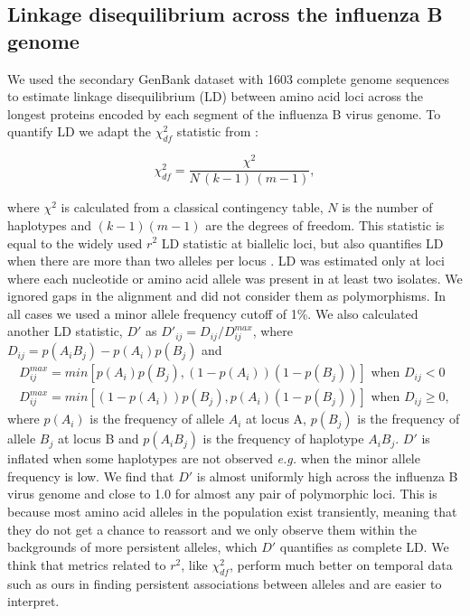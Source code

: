 \documentclass[11pt,oneside,letterpaper]{article}
\newcommand{\chiSq}{\chi^{2}_{df}}
\begin{document}
\subsection*{Linkage disequilibrium across the influenza B genome}
We used the secondary GenBank dataset with 1603 complete genome sequences to estimate linkage disequilibrium (LD) between amino acid loci across the longest proteins encoded by each segment of the influenza B virus genome.
To quantify LD we adapt the $\chiSq$ statistic from \citep{hedrick1986}:

\begin{equation}
\chiSq=\frac{\chi^{2}}{N\,(k-1)\,(m-1)},
\end{equation}

where $\chi^{2}$ is calculated from a classical contingency table, $N$ is the number of haplotypes and $(k-1)(m-1)$ are the degrees of freedom.
This statistic is equal to the widely used $r^2$ LD statistic at biallelic loci, but also quantifies LD when there are more than two alleles per locus \citep{zhao2005}.
LD was estimated only at loci where each nucleotide or amino acid allele was present in at least two isolates.
We ignored gaps in the alignment and did not consider them as polymorphisms.
In all cases we used a minor allele frequency cutoff of 1\%.
We also calculated another LD statistic, $D'$ \citep{lewontin1964} as $D'_{ij}=D_{ij}/D_{ij}^{max}$,
where $D_{ij}=p(A_i B_j) - p(A_i) p(B_j)$ and
\begin{equation}
\begin{split}
D_{ij}^{max}=min[ p(A_i) p(B_j) , (1-p(A_i))(1-p(B_j)) ] \mbox{ when } D_{ij} < 0\\
D_{ij}^{max}=min[ (1-p(A_i)) p(B_j) , p(A_i)(1-p(B_j)) ] \mbox{ when } D_{ij} \geq 0,
\end{split}
\end{equation}
where $p(A_i)$ is the frequency of allele $A_i$ at locus A, $p(B_j)$ is the frequency of allele $B_j$ at locus B and $p(A_i B_j)$ is the frequency of haplotype $A_i B_j$.
$D'$ is inflated when some haplotypes are not observed \textit{e.g.} when the minor allele frequency is low.
We find that $D'$ is almost uniformly high across the influenza B virus genome and close to 1.0 for almost any pair of polymorphic loci.
This is because most amino acid alleles in the population exist transiently, meaning that they do not get a chance to reassort and we only observe them within the backgrounds of more persistent alleles, which $D'$ quantifies as complete LD.
We think that metrics related to $r^2$, like $\chiSq$, perform much better on temporal data such as ours in finding persistent associations between alleles and are easier to interpret.
\end{document}
